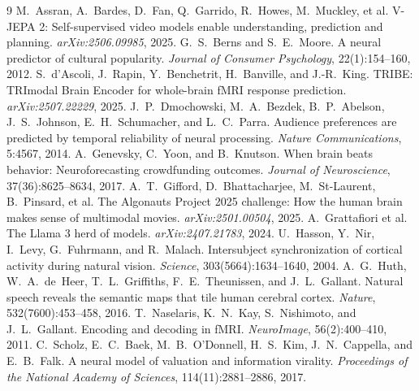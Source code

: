 \documentclass[11pt]{article}
\begin{document}
\begin{thebibliography}{9}
 M.~Assran, A.~Bardes, D.~Fan, Q.~Garrido, R.~Howes,
M.~Muckley, et al. V-JEPA 2: Self-supervised video models enable understanding, prediction and
planning. \emph{arXiv:2506.09985}, 2025.
 G.~S.~Berns and S.~E.~Moore. A neural predictor of
cultural popularity. \emph{Journal of Consumer Psychology}, 22(1):154--160, 2012.
 S.~d'Ascoli, J.~Rapin, Y.~Benchetrit,
H.~Banville, and J.-R.~King. TRIBE: TRImodal Brain Encoder for whole-brain fMRI response
prediction. \emph{arXiv:2507.22229}, 2025.
 J.~P.~Dmochowski, M.~A.~Bezdek,
B.~P.~Abelson, J.~S.~Johnson, E.~H.~Schumacher, and L.~C.~Parra. Audience preferences are predicted
by temporal reliability of neural processing. \emph{Nature Communications}, 5:4567, 2014.
 A.~Genevsky, C.~Yoon, and B.~Knutson. When brain
beats behavior: Neuroforecasting crowdfunding outcomes. \emph{Journal of Neuroscience},
37(36):8625--8634, 2017.
 A.~T.~Gifford, D.~Bhattacharjee, M.~St-Laurent,
B.~Pinsard, et al. The Algonauts Project 2025 challenge: How the human brain makes sense of
multimodal movies. \emph{arXiv:2501.00504}, 2025.
 A.~Grattafiori et al. The Llama 3 herd of
models. \emph{arXiv:2407.21783}, 2024.
 U.~Hasson, Y.~Nir, I.~Levy, G.~Fuhrmann, and
R.~Malach. Intersubject synchronization of cortical activity during natural vision.
\emph{Science}, 303(5664):1634--1640, 2004.
 A.~G.~Huth, W.~A.~de~Heer, T.~L.~Griffiths,
F.~E.~Theunissen, and J.~L.~Gallant. Natural speech reveals the semantic maps that tile human
cerebral cortex. \emph{Nature}, 532(7600):453--458, 2016.
 T.~Naselaris, K.~N.~Kay, S.~Nishimoto, and
J.~L.~Gallant. Encoding and decoding in fMRI. \emph{NeuroImage}, 56(2):400--410, 2011.
 C.~Scholz, E.~C.~Baek, M.~B.~O'Donnell,
H.~S.~Kim, J.~N.~Cappella, and E.~B.~Falk. A neural model of valuation and information virality.
\emph{Proceedings of the National Academy of Sciences}, 114(11):2881--2886, 2017.
\end{thebibliography}
\end{document}
